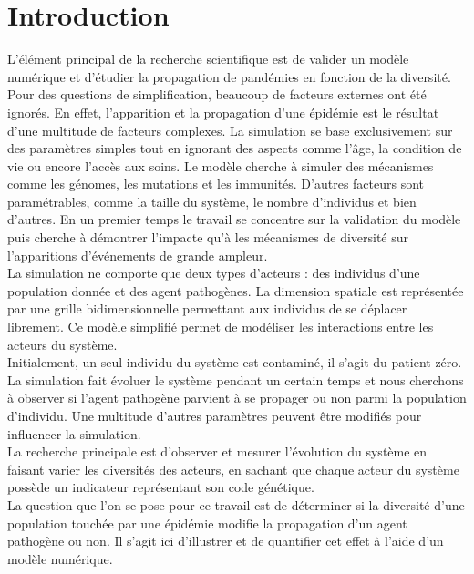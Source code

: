 \chapter{Introduction} \label{ch:introduction}

L'élément principal de la recherche scientifique est de valider un modèle numérique et d'étudier la propagation de pandémies en fonction de la diversité. Pour des questions de simplification, beaucoup de facteurs externes ont été ignorés. En effet, l'apparition et la propagation d'une épidémie est le résultat d'une multitude de facteurs complexes. La simulation se base exclusivement sur des paramètres simples tout en ignorant des aspects comme l'âge, la condition de vie ou encore l'accès aux soins. Le modèle cherche à simuler des mécanismes comme les génomes, les mutations et les immunités. D'autres facteurs sont paramétrables, comme la taille du système, le nombre d'individus et bien d'autres. En un premier temps le travail se concentre sur la validation du modèle puis cherche à démontrer l'impacte qu'à les mécanismes de diversité sur l'apparitions d'événements de grande ampleur.\\

La simulation ne comporte que deux types d'acteurs : des individus d'une population donnée et des agent pathogènes. La dimension spatiale est représentée par une grille bidimensionnelle permettant aux individus de se déplacer librement. Ce modèle simplifié permet de modéliser les interactions entre les acteurs du système.\\

Initialement, un seul individu du système est contaminé, il s'agit du patient zéro. La simulation fait évoluer le système pendant un certain temps et nous cherchons à observer si l'agent pathogène parvient à se propager ou non parmi la population d'individu. Une multitude d'autres paramètres peuvent être modifiés pour influencer la simulation.\\

La recherche principale est d'observer et mesurer l'évolution du système en faisant varier les diversités des acteurs, en sachant que chaque acteur du système possède un indicateur représentant son code génétique.\\

La question que l'on se pose pour ce travail est de déterminer si la diversité d'une population touchée par une épidémie modifie la propagation d'un agent pathogène ou non. Il s'agit ici d'illustrer et de quantifier cet effet à l'aide d'un modèle numérique.